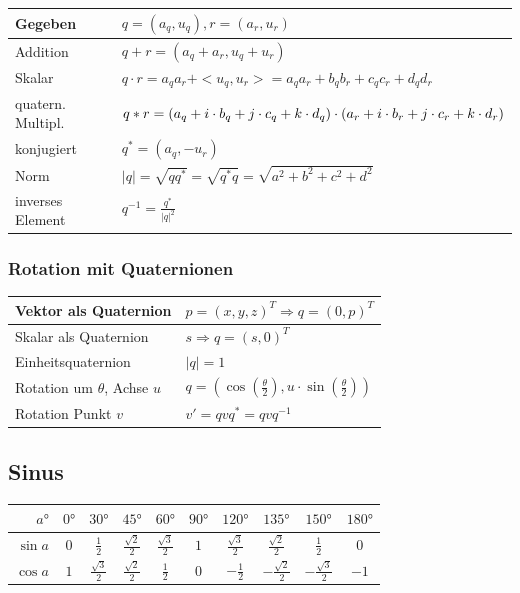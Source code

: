 \documentclass[8pt,a4paper,landscape]{scrartcl}
\begin{document}
\begin{multicols*}{3}
\begin{tabularx}{\columnwidth}{m{}|>{\raggedright\arraybackslash}X}
	Gegeben & $ q = (a_q, u_q), r=(a_r, u_r) $\\ \hline
	Addition & $ q + r = (a_q + a_r, u_q + u_r) $\\ \hline
	Skalar & $ q \cdot r = a_qa_r + <u_q, u_r> = a_qa_r + b_qb_r + c_qc_r +d_qd_r $\\ \hline
	quatern. Multipl. & $  q*r = \newline (a_q+i\cdot b_q + j\cdot c_q + k\cdot d_q)\cdot (a_r + i\cdot b_r + j\cdot c_r + k\cdot d_r) $\\ \hline
	konjugiert & $ q^{*} = (a_q, -u_r) $\\ \hline
	Norm & $ |q| = \sqrt{qq^{*}} = \sqrt{q^{*}q} = \sqrt{a^2+b^2+c^2+d^2} $\\ \hline
	inverses Element & $ q^{-1} = \frac{q^{*}}{|q|^2}$
\end{tabularx}

\subsubsection*{Rotation mit Quaternionen}
\begin{tabularx}{\columnwidth}{l|X}
	Vektor als Quaternion & $ p = (x,y,z)^T \Rightarrow q = (0, p)^T $\\ \hline
	Skalar als Quaternion & $ s \Rightarrow q = (s, 0)^T $\\ \hline
	Einheitsquaternion & $ |q| = 1 $\\ \hline
	Rotation um $ \theta $, Achse $ u $ & $ q = (\cos(\frac{\theta}{2}), u\cdot\sin(\frac{\theta}{2})) $\\ \hline
	Rotation Punkt $ v $ & $ v' = qvq^{*} = qvq^{-1} $
\end{tabularx}

\subsection*{Sinus}
\begin{tabularx}{\columnwidth}{r|c|c|c|c|c|c|c|c|c}
	$ a° $ & $ 0° $ & $ 30° $ & $ 45° $ & $ 60° $ & $ 90° $ & $ 120° $ & $ 135° $ & $ 150° $ & $ 180° $ \\ \hline
	$ \sin a$& $ 0 $& $ \frac{1}{2} $& $ \frac{\sqrt{2}}{2} $& $ \frac{\sqrt{3}}{2} $& $ 1 $& $ \frac{\sqrt{3}}{2} $& $ \frac{\sqrt{2}}{2} $& $ \frac{1}{2} $& $ 0 $\\ \hline
	$ \cos a$& $ 1 $& $ \frac{\sqrt{3}}{2} $& $ \frac{\sqrt{2}}{2} $& $ \frac{1}{2} $& $ 0 $& $ -\frac{1}{2} $& $ -\frac{\sqrt{2}}{2} $& $ -\frac{\sqrt{3}}{2} $& $ -1 $
\end{tabularx}

\end{multicols*}
\end{document}
